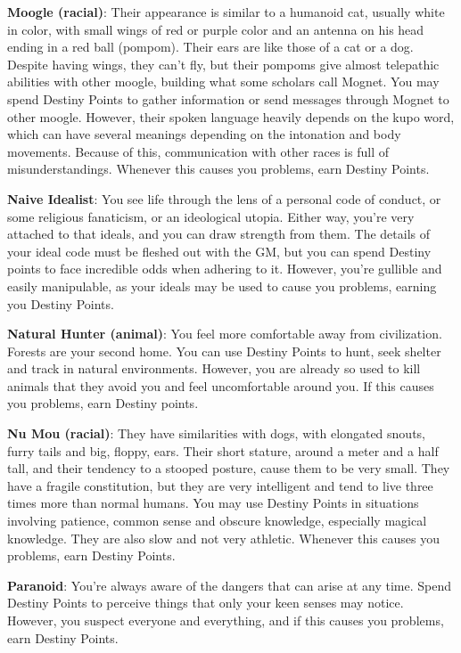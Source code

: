 \begin{multicols}{2}
\textbf{Moogle (racial)}: Their
appearance is similar to a
humanoid cat, usually white in
color, with small wings of red or
purple color and an antenna on
his head ending in a red ball
(pompom). Their ears are like
those of a cat or a dog. Despite
having wings, they can't fly, but
their pompoms give almost telepathic abilities
with other moogle, building what some scholars
call Mognet. You may spend Destiny Points to
gather information or send messages through
Mognet to other moogle. However, their spoken
language heavily depends on the kupo word,
which can have several meanings depending on
the intonation and body movements. Because of
this, communication with other races is full of
misunderstandings. Whenever this causes you
problems, earn Destiny Points.

\textbf{Naive Idealist}: You see life through the
lens of a personal code of conduct, or some
religious fanaticism, or an ideological utopia.
Either way, you're very attached to that ideals, and
you can draw strength from them. The details of
your ideal code must be fleshed out with the GM,
but you can spend Destiny points to face incredible
odds when adhering to it. However, you're gullible
and easily manipulable, as your ideals may be used
to cause you problems, earning you Destiny Points.

\textbf{Natural Hunter (animal)}: You feel more
comfortable away from civilization. Forests are
your second home. You can use Destiny Points to
hunt, seek shelter and track in natural
environments. However, you are already so used to
kill animals that they avoid you and feel
uncomfortable around you. If this causes you
problems, earn Destiny points.

\textbf{Nu Mou (racial)}: They have similarities
with dogs, with elongated snouts, furry tails and
big, floppy, ears. Their
short stature, around a
meter and a half tall, and
their tendency to a
stooped posture, cause
them to be very small.
They have a fragile
constitution, but they are
very intelligent and tend to live three times more
than normal humans. You may use Destiny Points
in situations involving patience, common sense
and obscure knowledge, especially magical
knowledge. They are also slow and not very
athletic. Whenever this causes you problems, earn
Destiny Points.

\textbf{Paranoid}: You're always aware of the
dangers that can arise at any time. Spend Destiny
Points to perceive things that only your keen
senses may notice. However, you suspect everyone
and everything, and if this causes you problems,
earn Destiny Points.


\end{multicols}
